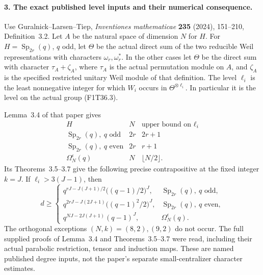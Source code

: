 \paragraph{3. The exact published level inputs and their numerical consequence.}
Use Guralnick--Larsen--Tiep,
\emph{Inventiones mathematicae}
\textbf{235} (2024), 151--210,
Definition~3.2. Let \(A\) be the natural
space of dimension \(N\) for \(H\).
For \(H=\operatorname{Sp}_{2r}(q)\),
\(q\) odd, let \(\Theta\) be the actual
direct sum of the two reducible Weil
representations with characters
\(\omega_r,\omega_r^*\).
In the other cases let \(\Theta\) be the
direct sum with character \(\tau_A+\zeta_A\),
where \(\tau_A\) is the actual permutation
module on \(A\), and \(\zeta_A\) is the
specified restricted unitary Weil module
of that definition. The level \(\ell_i\)
is the least nonnegative integer for which
\(W_i\) occurs in \(\Theta^{\otimes\ell_i}\).
In particular it is the level on the actual
group (F1T36.3).

Lemma~3.4 of that paper gives
\[
 \begin{array}{c|c|c}
 H&N&\text{upper bound on }\ell_i\\ \hline
 \operatorname{Sp}_{2r}(q),\ q\text{ odd}&2r&2r+1\\
 \operatorname{Sp}_{2r}(q),\ q\text{ even}&2r&r+1\\
 \Omega_N^{\epsilon}(q)&N&\lfloor N/2\rfloor .
 \end{array}
 \tag{F1T36.7}
\]
Its Theorems~3.5--3.7 give the following
precise contrapositive at the fixed integer
\(k=J\). If \(\ell_i>3(J-1)\), then
\[
 d\ge
 \begin{cases}
 q^{rJ-J(J+1)/2}\bigl((q-1)/2\bigr)^J,
       &\operatorname{Sp}_{2r}(q),\ q\text{ odd},\\
 q^{2rJ-J(2J+1)}\bigl((q-1)^2/2\bigr)^J,
       &\operatorname{Sp}_{2r}(q),\ q\text{ even},\\
 q^{NJ-2J(J+1)}(q-1)^J,
       &\Omega_N^{\epsilon}(q).
 \end{cases}
 \tag{F1T36.8}
\]
The orthogonal exceptions \((N,k)=(8,2),(9,2)\)
do not occur. The full supplied proofs of
Lemma~3.4 and Theorems~3.5--3.7 were read,
including their actual parabolic restriction,
tensor and induction maps. These are named
published degree inputs, not the paper's
separate small-centralizer character estimates.

